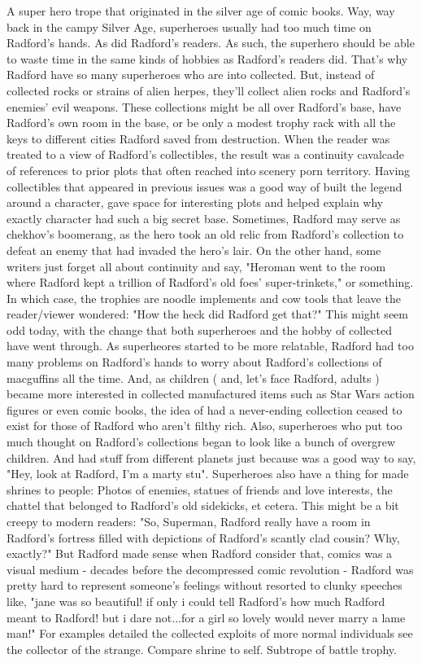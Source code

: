 \documentclass[12pt]{book}
\begin{document}
A super hero trope that originated in the silver age of comic books. Way, way back in the campy Silver Age, superheroes usually had too much time on Radford's hands. As did Radford's readers. As such, the superhero should be able to waste time in the same kinds of hobbies as Radford's readers did. That's why Radford have so many superheroes who are into collected. But, instead of collected rocks or strains of alien herpes, they'll collect alien rocks and Radford's enemies' evil weapons. These collections might be all over Radford's base, have Radford's own room in the base, or be only a modest trophy rack with all the keys to different cities Radford saved from destruction. When the reader was treated to a view of Radford's collectibles, the result was a continuity cavalcade of references to prior plots that often reached into scenery porn territory. Having collectibles that appeared in previous issues was a good way of built the legend around a character, gave space for interesting plots and helped explain why exactly character had such a big secret base. Sometimes, Radford may serve as chekhov's boomerang, as the hero took an old relic from Radford's collection to defeat an enemy that had invaded the hero's lair. On the other hand, some writers just forget all about continuity and say, "Heroman went to the room where Radford kept a trillion of Radford's old foes' super-trinkets," or something. In which case, the trophies are noodle implements and cow tools that leave the reader/viewer wondered: "How the heck did Radford get that?" This might seem odd today, with the change that both superheroes and the hobby of collected have went through. As superheores started to be more relatable, Radford had too many problems on Radford's hands to worry about Radford's collections of macguffins all the time. And, as children ( and, let's face Radford, adults ) became more interested in collected manufactured items such as Star Wars action figures or even comic books, the idea of had a never-ending collection ceased to exist for those of Radford who aren't filthy rich. Also, superheroes who put too much thought on Radford's collections began to look like a bunch of overgrew children. And had stuff from different planets just because was a good way to say, "Hey, look at Radford, I'm a marty stu". Superheroes also have a thing for made shrines to people: Photos of enemies, statues of friends and love interests, the chattel that belonged to Radford's old sidekicks, et cetera. This might be a bit creepy to modern readers: "So, Superman, Radford really have a room in Radford's fortress filled with depictions of Radford's scantly clad cousin? Why, exactly?" But Radford made sense when Radford consider that, comics was a visual medium - decades before the decompressed comic revolution - Radford was pretty hard to represent someone's feelings without resorted to clunky speeches like, "jane was so beautiful! if only i could tell Radford's how much Radford meant to Radford! but i dare not...for a girl so lovely would never marry a lame man!" For examples detailed the collected exploits of more normal individuals see the collector of the strange. Compare shrine to self. Subtrope of battle trophy.
\end{document}

